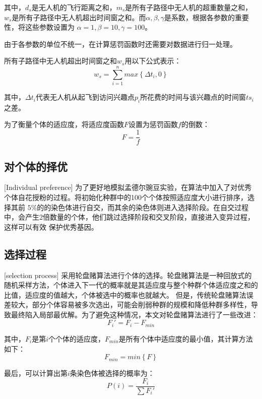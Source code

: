 其中，$d_s$是无人机的飞行距离之和，$m_s$是所有子路径中无人机的超重数量之和，$w_s$是所有子路径中无人机超出时间窗之和。而$\alpha,\beta,\gamma$是系数，根据各参数的重要性，将这些参数设置为
$\alpha = 1,\beta = 10,\gamma = 100$。


由于各参数的单位不统一，在计算惩罚函数时还需要对数据进行归一处理。


所有子路径中无人机超出时间窗之和$w_s$用以下公式表示：
\begin{equation}
w_s = \sum_{i=1}^n max\left\{\Delta t_i,0\right\}
\end{equation}

其中，$\Delta t_i$代表无人机从起飞到访问兴趣点$p_i$所花费的时间与该兴趣点的时间窗$ts_i$之差。


为了衡量个体的适应度，将适应度函数$F$设置为惩罚函数$f$的倒数：
\begin{equation} 
	F = \frac{1}{f}
\end{equation}

\subsection{对个体的择优}[Individual preference]
为了更好地模拟孟德尔豌豆实验，在算法中加入了对优秀个体自花授粉的过程。将初始化种群中的100个个体按照适应度大小进行排序，选择其前
$5\%$的的染色体进行自交，而其余的染色体则进入选择阶段。在自交过程中，会产生2倍数量的个体，他们跳过选择阶段和交叉阶段，直接进入变异过程，这样可以有效
保护优秀基因。

\subsection{选择过程}[selection process]
采用轮盘赌算法进行个体的选择。轮盘赌算法是一种回放式的随机采样方法，个体进入下一代的概率就是其适应度与整个种群个体适应度之和的比值，适应度的值越大，个体被选中的概率也就越大。
但是，传统轮盘赌算法误差较大，部分个体容易被多次选出，可能会削弱种群的规模和降低种群多样性，导致最终陷入局部最优解。为了避免这种情况，本文对轮盘赌算法进行了一些改进：
\begin{equation} 
	F_i' = F_i - F_{min} 
\end{equation}


其中，$F_i$是第$i$个个体的适应度，$F_{min}$是所有个体中适应度的最小值，其计算方法如下：
\begin{equation}
	F_{min} = min\left\{F\right\} 
\end{equation}


最后，可以计算出第$i$条染色体被选择的概率为：
\begin{equation}
	P(i) = \frac{F_i}{\sum F_i'} 
\end{equation}

